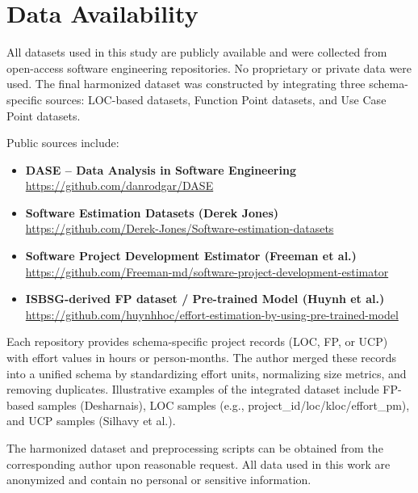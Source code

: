 \documentclass[11pt,a4paper]{article}
\begin{document}

\section*{Data Availability}
\raggedright
All datasets used in this study are publicly available and were collected from
open-access software engineering repositories. No proprietary or private data were used.
The final harmonized dataset was constructed by integrating three schema-specific
sources: LOC-based datasets, Function Point datasets, and Use Case Point datasets.

Public sources include:

\begin{itemize}
    \item \textbf{DASE – Data Analysis in Software Engineering}  
    \url{https://github.com/danrodgar/DASE}

    \item \textbf{Software Estimation Datasets (Derek Jones)}  
    \url{https://github.com/Derek-Jones/Software-estimation-datasets}

    \item \textbf{Software Project Development Estimator (Freeman et al.)}  
    \url{https://github.com/Freeman-md/software-project-development-estimator}

    \item \textbf{ISBSG-derived FP dataset / Pre-trained Model (Huynh et al.)}  
    \url{https://github.com/huynhhoc/effort-estimation-by-using-pre-trained-model}
\end{itemize}

Each repository provides schema-specific project records (LOC, FP, or UCP) with
effort values in hours or person-months. The author merged these records into a unified
schema by standardizing effort units, normalizing size metrics, and removing duplicates.
Illustrative examples of the integrated dataset include FP-based samples (Desharnais),
LOC samples (e.g., project\_id/loc/kloc/effort\_pm), and UCP samples (Silhavy et al.).

The harmonized dataset and preprocessing scripts can be obtained from the corresponding
author upon reasonable request. All data used in this work are anonymized and contain no
personal or sensitive information.
\end{document}
